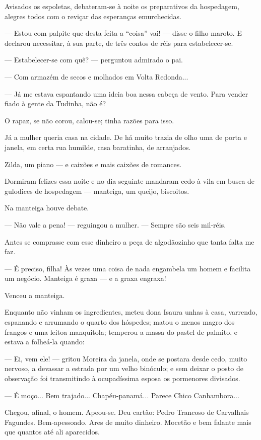 Avisados os espoletas, debateram-se à noite os preparativos da
hospedagem, alegres todos com o reviçar das esperanças emurchecidas.

--- Estou com palpite que desta feita a ``coisa'' vai! --- disse o filho
maroto. E declarou necessitar, à sua parte, de três contos de réis para
estabelecer-se.

--- Estabelecer-se com quê? --- perguntou admirado o pai.

--- Com armazém de secos e molhados em Volta Redonda...

--- Já me estava espantando uma ideia boa nessa cabeça de vento. Para
vender fiado à gente da Tudinha, não é?

O rapaz, se não corou, calou-se; tinha razões para isso.

Já a mulher queria casa na cidade. De há muito trazia de olho uma de
porta e janela, em certa rua humilde, casa baratinha, de arranjados.

Zilda, um piano --- e caixões e mais caixões de romances.

Dormiram felizes essa noite e no dia seguinte mandaram cedo à vila em
busca de gulodices de hospedagem --- manteiga, um queijo, biscoitos.

Na manteiga houve debate.

--- Não vale a pena! --- reguingou a mulher. --- Sempre são seis
mil-réis.

Antes se comprasse com esse dinheiro a peça de algodãozinho que tanta
falta me faz.

--- É preciso, filha! Às vezes uma coisa de nada engambela um homem e
facilita um negócio. Manteiga é graxa --- e a graxa engraxa!

Venceu a manteiga.

Enquanto não vinham os ingredientes, meteu dona Isaura unhas à casa,
varrendo, espanando e arrumando o quarto dos hóspedes; matou o menos
magro dos frangos e uma leitoa manquitola; temperou a massa do pastel de
palmito, e estava a folheá-la quando:

--- Ei, vem ele! --- gritou Moreira da janela, onde se postara desde
cedo, muito nervoso, a devassar a estrada por um velho binóculo; e sem
deixar o posto de observação foi transmitindo à ocupadíssima esposa os
pormenores divisados.

--- É moço... Bem trajado... Chapéu-panamá... Parece Chico Canhambora...

Chegou, afinal, o homem. Apeou-se. Deu cartão: Pedro Trancoso de
Carvalhais Fagundes. Bem-apessoado. Ares de muito dinheiro. Mocetão e
bem falante mais que quantos até ali aparecidos.

